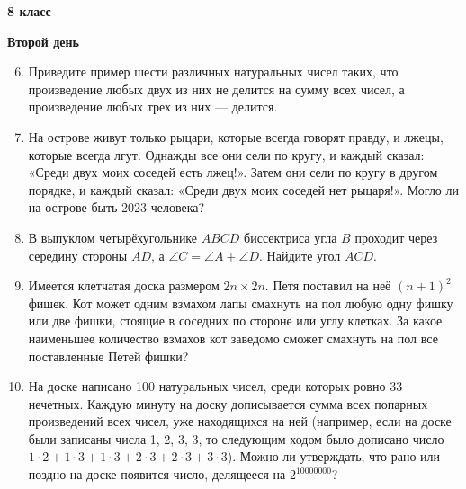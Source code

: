 \documentclass{article}
\begin{document}
    \newpage

    \begin{center}
        \LARGE\textbf{8 класс}
    \end{center}
    \begin{center}
        \large\textbf{Второй день}
    \end{center}


    \begin{enumerate}[label*=8.{\arabic{enumi}}]
        \setcounter{enumi}{5}
        \item Приведите пример шести различных натуральных чисел таких, что произведение любых двух из них не делится на сумму всех чисел, а произведение любых трех из них — делится.

        \item На острове живут только рыцари, которые всегда говорят правду, и лжецы, которые всегда лгут.
        Однажды все они сели по кругу, и каждый сказал: «Среди двух моих соседей есть лжец!».
        Затем они сели по кругу в другом порядке, и каждый сказал: «Среди двух моих соседей нет рыцаря!».
        Могло ли на острове быть 2023 человека?

        \item В выпуклом четырёхугольнике $ABCD$ биссектриса угла $B$ проходит через середину стороны $AD$, а $\angle C = \angle A+\angle D$.
        Найдите угол $ACD$.

        \item Имеется клетчатая доска размером $2n\times 2n$.
        Петя поставил на неё $(n+1)^2$ фишек.
        Кот может одним взмахом лапы смахнуть на пол любую одну фишку или две фишки, стоящие в соседних по стороне или углу клетках.
        За какое наименьшее количество взмахов кот заведомо сможет смахнуть на пол все поставленные Петей фишки?

        \item На доске написано 100 натуральных чисел, среди которых ровно 33 нечетных.
        Каждую минуту на доску дописывается сумма всех попарных произведений всех чисел, уже находящихся на ней (например, если на доске были записаны числа 1, 2, 3, 3, то следующим ходом было дописано число $1\cdot 2+1\cdot 3+1\cdot 3+2\cdot 3+2\cdot 3+3\cdot 3$). Можно ли утверждать, что рано или поздно на доске появится число, делящееся на $2^{10000000}$?

    \end{enumerate}
\end{document}
